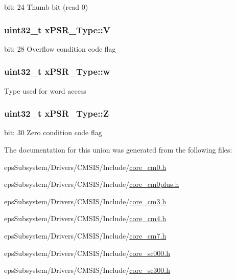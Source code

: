 bit\-: 24 Thumb bit (read 0) \hypertarget{unionx_p_s_r___type_af14df16ea0690070c45b95f2116b7a0a}{
\subsubsection[{V}]{\setlength{\rightskip}{0pt plus 5cm}uint32\-\_\-t x\-P\-S\-R\-\_\-\-Type\-::\-V}}\label{unionx_p_s_r___type_af14df16ea0690070c45b95f2116b7a0a}
bit\-: 28 Overflow condition code flag \hypertarget{unionx_p_s_r___type_a1a47176768f45f79076c4f5b1b534bc2}{
\subsubsection[{w}]{\setlength{\rightskip}{0pt plus 5cm}uint32\-\_\-t x\-P\-S\-R\-\_\-\-Type\-::w}}\label{unionx_p_s_r___type_a1a47176768f45f79076c4f5b1b534bc2}
Type used for word access \hypertarget{unionx_p_s_r___type_a1e5d9801013d5146f2e02d9b7b3da562}{
\subsubsection[{Z}]{\setlength{\rightskip}{0pt plus 5cm}uint32\-\_\-t x\-P\-S\-R\-\_\-\-Type\-::\-Z}}\label{unionx_p_s_r___type_a1e5d9801013d5146f2e02d9b7b3da562}
bit\-: 30 Zero condition code flag 

The documentation for this union was generated from the following files\-:\begin{DoxyCompactItemize}
\item 
eps\-Subsystem/\-Drivers/\-C\-M\-S\-I\-S/\-Include/\hyperlink{core__cm0_8h}{core\-\_\-cm0.\-h}\item 
eps\-Subsystem/\-Drivers/\-C\-M\-S\-I\-S/\-Include/\hyperlink{core__cm0plus_8h}{core\-\_\-cm0plus.\-h}\item 
eps\-Subsystem/\-Drivers/\-C\-M\-S\-I\-S/\-Include/\hyperlink{core__cm3_8h}{core\-\_\-cm3.\-h}\item 
eps\-Subsystem/\-Drivers/\-C\-M\-S\-I\-S/\-Include/\hyperlink{core__cm4_8h}{core\-\_\-cm4.\-h}\item 
eps\-Subsystem/\-Drivers/\-C\-M\-S\-I\-S/\-Include/\hyperlink{core__cm7_8h}{core\-\_\-cm7.\-h}\item 
eps\-Subsystem/\-Drivers/\-C\-M\-S\-I\-S/\-Include/\hyperlink{core__sc000_8h}{core\-\_\-sc000.\-h}\item 
eps\-Subsystem/\-Drivers/\-C\-M\-S\-I\-S/\-Include/\hyperlink{core__sc300_8h}{core\-\_\-sc300.\-h}\end{DoxyCompactItemize}

